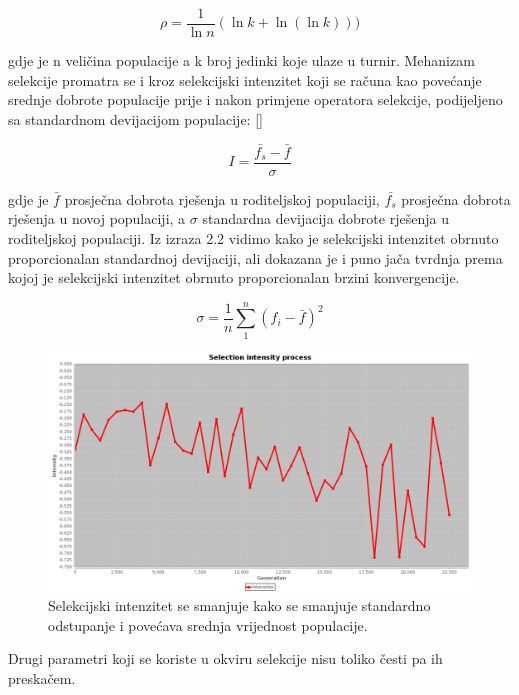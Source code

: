 \documentclass[times, utf8, zavrsni]{fer}
\begin{document}
	\begin{equation}
		\rho=\frac{1}{\ln{n}} (\ln{k} + \ln{(\ln{k})})) 
	\end{equation}
	
	gdje je n veličina populacije a k broj jedinki koje ulaze u turnir. Mehanizam selekcije promatra se i kroz selekcijski intenzitet koji se računa kao povećanje srednje dobrote populacije prije i nakon primjene operatora selekcije, podijeljeno sa standardnom devijacijom populacije: [\cite{Back1995, MillerAndGoldberg, MuhlenbeinAndVoosen, Thierens}]
	
	\begin{equation}
		\label{izraz}
		I=\frac{\bar{f_s} - \bar{f}}{\sigma}
	\end{equation}
	
	gdje je $\bar{f}$ prosječna dobrota rješenja u roditeljskoj populaciji, $\bar{f_s}$ prosječna dobrota rješenja u novoj populaciji, a $\sigma$ standardna devijacija dobrote rješenja u roditeljskoj populaciji. Iz izraza 2.2 vidimo kako je selekcijski intenzitet obrnuto proporcionalan standardnoj devijaciji, ali dokazana je i puno jača tvrdnja prema kojoj je selekcijski intenzitet obrnuto proporcionalan brzini konvergencije. 
	
	\begin{equation}
		\sigma=\frac{1}{n}\sum_{1}^{n}(f_i - \bar{f})^2
	\end{equation}
	
	\begin{figure}[!htb]
		\centering
		\includegraphics[width=15cm]{slike/intensity.png}
		\caption{Selekcijski intenzitet se smanjuje kako se smanjuje standardno odstupanje i povećava srednja vrijednost populacije. }
		\label{fig:k-tour-select}
	\end{figure}
	
	Drugi parametri koji se koriste u okviru selekcije nisu toliko česti pa ih preskačem. 
	
\end{document}
